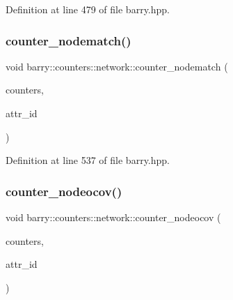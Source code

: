 Definition at line 479 of file barry.\+hpp.

\mbox{\label{namespacebarry_1_1counters_1_1network_ab0a33b2990950574552ab909e6847f96}} 
\subsubsection{\texorpdfstring{counter\+\_\+nodematch()}{counter\_nodematch()}}
{\footnotesize\ttfamily void barry\+::counters\+::network\+::counter\+\_\+nodematch (\begin{DoxyParamCaption}\item[{\hyperlink{namespacebarry_1_1counters_1_1network_a3b3c590303d47840d1967372ae495d95}{Net\+Counter\+Vector} $\ast$}]{counters,  }\item[{\hyperlink{namespacebarry_a11dfc53ddb4672278319aa04f1e09a6c}{uint}}]{attr\+\_\+id }\end{DoxyParamCaption})\hspace{0.3cm}{\ttfamily [inline]}}



Definition at line 537 of file barry.\+hpp.

\mbox{\label{namespacebarry_1_1counters_1_1network_a2804cd2dba633fdccc7a1ca6a15bdf47}} 
\subsubsection{\texorpdfstring{counter\+\_\+nodeocov()}{counter\_nodeocov()}}
{\footnotesize\ttfamily void barry\+::counters\+::network\+::counter\+\_\+nodeocov (\begin{DoxyParamCaption}\item[{\hyperlink{namespacebarry_1_1counters_1_1network_a3b3c590303d47840d1967372ae495d95}{Net\+Counter\+Vector} $\ast$}]{counters,  }\item[{\hyperlink{namespacebarry_a11dfc53ddb4672278319aa04f1e09a6c}{uint}}]{attr\+\_\+id }\end{DoxyParamCaption})\hspace{0.3cm}{\ttfamily [inline]}}



